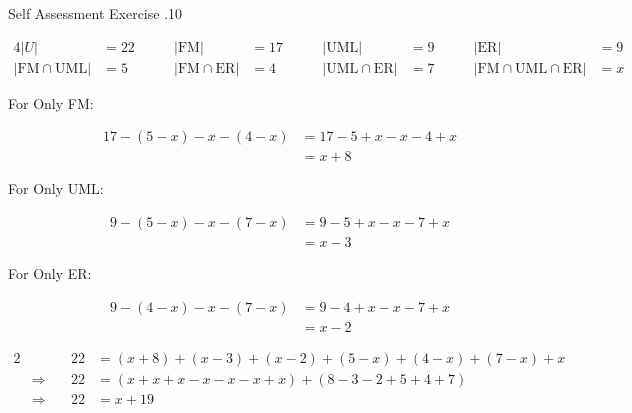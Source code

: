 \documentclass[../notes.tex]{subfiles}
\begin{document}
\begin{exercise}{Self Assessment Exercise \thechapter.10}
\begin{enumerate}
						\begin{alignat*}{4}
							\left\lvert U\right\rvert &= 22 \qquad & \left\lvert \mathrm{FM}\right\rvert&= 17 \qquad & \left\lvert \mathrm{UML}\right\rvert &= 9 \qquad & \left\lvert \mathrm{ER}\right\rvert &= 9 \\
							\left\lvert \mathrm{FM} \cap \mathrm{UML}\right\rvert &= 5 \qquad & \left\lvert \mathrm{FM} \cap \mathrm{ER}\right\rvert &= 4 \qquad & \left\lvert \mathrm{UML} \cap \mathrm{ER}\right\rvert &= 7 \qquad & \left\lvert \mathrm{FM} \cap \mathrm{UML} \cap \mathrm{ER}\right\rvert &= x  
						\end{alignat*}
						\begin{center}
							\begin{vennthree}[showframe=true, radius=3.5cm, overlap=2.3cm, labelA={FM}, labelB={UML}, labelC={ER}, labelABC={$x$}, labelOnlyAB={$5 - x$}, labelOnlyAC={$4 - x$}, labelOnlyBC={$7 - x$}, labelOnlyA={$x + 8$}, labelOnlyB={$x - 3$}, labelOnlyC={$x - 2$}]
							\end{vennthree}
						\end{center}
						\begin{description}
							\item[For Only FM:] \moveup
								\begin{align*}
									17 - (5 - x) - x - (4 - x) &= 17 - 5 + x - x - 4 + x\\
									&= x + 8
								\end{align*}
							\item[For Only UML:] \moveup
								\begin{align*}
									9 - (5 - x) - x - (7 - x) &= 9 - 5 + x - x - 7 + x\\
									&= x - 3
								\end{align*}
							\item[For Only ER:] \moveup
								\begin{align*}
									9 - (4 - x) - x - (7 - x) &= 9 - 4 + x - x - 7 + x\\
									&= x - 2
								\end{align*}
						\end{description}
						\begin{alignat*}{2}
							& & 22 &= (x + 8) + (x - 3) + (x - 2) + (5 - x) + (4 - x) + (7 - x) + x\\
							& \Rightarrow \quad & 22 &= (x + x + x - x - x - x + x) + (8 - 3 - 2 + 5 + 4 + 7)\\
							& \Rightarrow \quad & 22 &= x + 19\\

\end{alignat*}
\end{enumerate}
\end{exercise}
\end{document}
